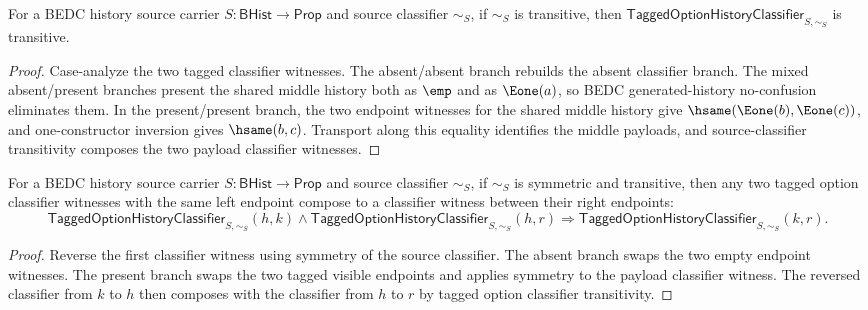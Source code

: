 \begin{theorem}
\label{thm:tagged-option-history-classifier-transitivity}
For a BEDC history source carrier $S:\mathsf{BHist}\to\mathsf{Prop}$ and source
classifier $\sim_S$, if $\sim_S$ is transitive, then
$\mathsf{TaggedOptionHistoryClassifier}_{S,\sim_S}$ is transitive.
\end{theorem}
\begin{proof}
Case-analyze the two tagged classifier witnesses. The absent/absent branch
rebuilds the absent classifier branch. The mixed absent/present branches present
the shared middle history both as \(\emp\) and as \(\Eone(a)\), so BEDC
generated-history no-confusion eliminates them. In the present/present branch,
the two endpoint witnesses for the shared middle history give
\(\hsame(\Eone(b),\Eone(c))\), and one-constructor inversion gives
\(\hsame(b,c)\). Transport along this equality identifies the middle payloads,
and source-classifier transitivity composes the two payload classifier
witnesses.
\end{proof}

\begin{theorem}
\label{thm:tagged-option-history-classifier-left-confluence}
For a BEDC history source carrier $S:\mathsf{BHist}\to\mathsf{Prop}$ and source
classifier $\sim_S$, if $\sim_S$ is symmetric and transitive, then any two
tagged option classifier witnesses with the same left endpoint compose to a
classifier witness between their right endpoints:
$$
\mathsf{TaggedOptionHistoryClassifier}_{S,\sim_S}(h,k)\land
\mathsf{TaggedOptionHistoryClassifier}_{S,\sim_S}(h,r)
\Longrightarrow
\mathsf{TaggedOptionHistoryClassifier}_{S,\sim_S}(k,r).
$$
\end{theorem}
\begin{proof}
Reverse the first classifier witness using symmetry of the source classifier.
The absent branch swaps the two empty endpoint witnesses. The present branch
swaps the two tagged visible endpoints and applies symmetry to the payload
classifier witness. The reversed classifier from $k$ to $h$ then composes with
the classifier from $h$ to $r$ by tagged option classifier transitivity.
\end{proof}

